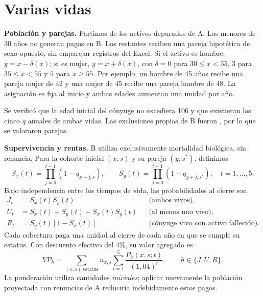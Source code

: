 \section{Varias vidas}
\label{sec:varias-vidas}


\textbf{Población y parejas.} Partimos de los \NInicialB{} activos depurados de A.
Los \NMenoresB{} menores de 30 años no generan pagos en B. Los restantes
\NParejasTeoricasB{} reciben una pareja hipotética de sexo opuesto, sin emparejar
registros del Excel. Si el activo es hombre, $y=x-\delta(x)$; si es mujer,
$y=x+\delta(x)$, con $\delta=0$ para $30\leq x<35$, $3$ para $35\leq x<55$
y $5$ para $x\geq55$. Por ejemplo, un hombre de 45 años recibe una pareja mujer
de 42 y una mujer de 45 recibe una pareja hombre de 48. La asignación se fija
al inicio y ambas edades aumentan una unidad por año.

Se verificó que la edad inicial del cónyuge no excediera 106 y que existieran
los cinco $q$ anuales de ambas vidas. Las exclusiones propias de B fueron
\NExcluidasB{}, por lo que se valoraron \NParejasB{} parejas.

\textbf{Supervivencia y rentas.} B utiliza exclusivamente mortalidad biológica,
sin renuncia. Para la cohorte inicial $(x,s)$ y su pareja $(y,s^*)$, definimos
\[
 S_x(t)=\prod_{j=0}^{t-1}(1-q_{x+j,s}),\qquad
 S_y(t)=\prod_{j=0}^{t-1}(1-q_{y+j,s^*}),\quad t=1,\ldots,5.
\]
Bajo independencia entre los tiempos de vida, las probabilidades al cierre son
\[
 \begin{aligned}
 J_t&=S_x(t)S_y(t) &&\text{(ambos vivos)},\\
 U_t&=S_x(t)+S_y(t)-S_x(t)S_y(t) &&\text{(al menos uno vivo)},\\
 R_t&=S_y(t)[1-S_x(t)] &&\text{(cónyuge vivo con activo fallecido)}.
 \end{aligned}
\]
Cada cobertura paga una unidad al cierre de cada año en que se cumple su
estatus. Con descuento efectivo del $4\%$, su valor agregado es
\[
 VP_h=\sum_{(x,s)\text{ estatus}}n_{x,s}
       \sum_{t=1}^{5}\frac{P_h(x,s;t)}{(1{,}04)^t},
 \qquad h\in\{J,U,R\}.
\]
La ponderación utiliza cantidades \emph{iniciales}; aplicar nuevamente la
población proyectada con renuncias de A reduciría indebidamente estos pagos.

